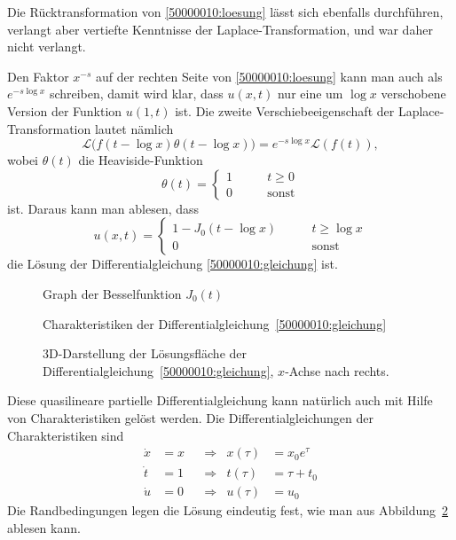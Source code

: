 \begin{diskussion}
Die Rücktransformation von \eqref{50000010:loesung} lässt sich
ebenfalls durchführen, verlangt aber vertiefte Kenntnisse der
Laplace-Transformation, und war daher nicht verlangt.

Den Faktor $x^{-s}$ auf der rechten Seite von \eqref{50000010:loesung}
kann man auch als $e^{-s\log x}$
schreiben, damit wird klar, dass $u(x,t)$ nur eine um $\log x$ verschobene
Version der Funktion $u(1,t)$ ist. 
Die zweite Verschiebeeigenschaft der Laplace-Transformation lautet nämlich
\[
\mathscr{L}\bigl(f(t-\log x)\theta(t-\log x)\bigr)
=
e^{-s\log x}\mathscr{L}(f(t)),
\]
wobei $\theta(t)$ die Heaviside-Funktion
\[
\theta(t)=\begin{cases}1\qquad&t \ge 0\\ 0&\text{sonst}\end{cases}
\]
ist. Daraus kann man ablesen, dass
\begin{equation}
u(x,t)=\begin{cases}
1-J_0(t-\log x)\qquad
&t \ge \log x\\
0
&\text{sonst}
\end{cases}
\label{50000010:ruecktransformiert}
\end{equation}
die Lösung der Differentialgleichung \eqref{50000010:gleichung} ist.
\begin{figure}
\centering
{}
\caption{Graph der Besselfunktion $J_0(t)$
\label{50000010:besselj0}}
\end{figure}
\begin{figure}
\centering
{}
\caption{Charakteristiken der Differentialgleichung~\eqref{50000010:gleichung}
\label{50000010:charakteristiken}}
\end{figure}
\begin{figure}
\centering
{}
\caption{3D-Darstellung der Lösungsfläche der
Differentialgleichung~\eqref{50000010:gleichung}, $x$-Achse nach rechts.
\label{50000010:loesung}}
\end{figure}


Diese quasilineare partielle Differentialgleichung kann natürlich auch
mit Hilfe von Charakteristiken gelöst werden.
Die Differentialgleichungen der Charakteristiken sind
\begin{equation}
\begin{aligned}
\dot x&=x&
&\Rightarrow&
x(\tau)&=x_0e^\tau
\\
\dot t&=1&
&\Rightarrow&
t(\tau)&=\tau + t_0
\\
\dot u&=0&
&\Rightarrow&
u(\tau)&=u_0
\end{aligned}
\label{50000010:chardgl}
\end{equation}
Die Randbedingungen legen die Lösung eindeutig fest, wie man aus
Abbildung~\ref{50000010:charakteristiken} ablesen kann.


\end{diskussion}
